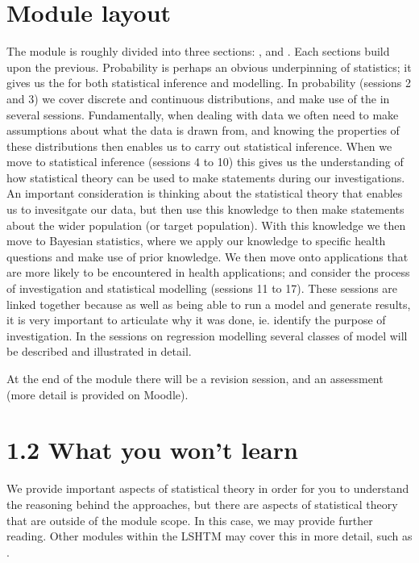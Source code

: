 \documentclass[letterpaper,10pt,english]{jupyterBook}
\begin{document}
\section{Module layout}
\label{\detokenize{01. Introduction:module-layout}}
\sphinxAtStartPar
The module is roughly divided into three sections: ,  and . Each sections build upon the previous. Probability is perhaps an obvious underpinning of statistics; it gives us the  for both statistical inference and modelling. In probability (sessions 2 and 3) we cover discrete and continuous distributions, and make use of the  in several sessions. Fundamentally, when dealing with data we often need to make assumptions about what  the data is drawn from, and knowing the properties of these distributions then enables us to carry out statistical inference. When we move to statistical inference (sessions 4 to 10) this gives us the understanding of how statistical theory can be used to make statements during our investigations. An important consideration is thinking about the statistical theory that enables us to invesitgate our data, but then use this knowledge to then make statements about the wider population (or target population). With this knowledge we then move to Bayesian statistics, where we apply our knowledge to specific health questions and make use of prior knowledge. We then move onto applications that are more likely to be encountered in health applications; and consider the process of investigation and statistical modelling (sessions 11 to 17). These sessions are linked together because as well as being able to run a model and generate results, it is very important to articulate why it was done, ie. identify the purpose of investigation. In the sessions on regression modelling several classes of model will be described and illustrated in detail.

\sphinxAtStartPar
At the end of the module there will be a revision session, and an assessment (more detail is provided on Moodle).


\section{1.2 What you won’t learn}
\label{\detokenize{01. Introduction:what-you-won-t-learn}}
\sphinxAtStartPar
We provide important aspects of statistical theory in order for you to understand the reasoning behind the approaches, but there are aspects of statistical theory that are outside of the module scope. In this case, we may provide further reading. Other modules within the LSHTM may cover this in more detail, such as .
\end{document}
